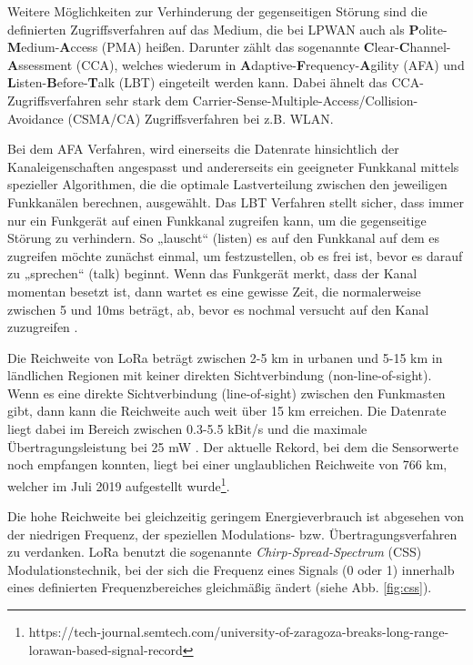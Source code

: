 Weitere Möglichkeiten zur Verhinderung der gegenseitigen Störung sind die definierten Zugriffsverfahren auf das Medium, die bei LPWAN auch als \textbf{P}olite-\textbf{M}edium-\textbf{A}ccess (PMA) heißen. Darunter zählt das sogenannte \textbf{C}lear-\textbf{C}hannel-\textbf{A}ssessment (CCA), welches wiederum in \textbf{A}daptive-\textbf{F}requency-\textbf{A}gility (AFA) und \textbf{L}isten-\textbf{B}efore-\textbf{T}alk (LBT) eingeteilt werden kann. Dabei ähnelt das CCA-Zugriffsverfahren sehr stark dem Carrier-Sense-Multiple-Access/Collision-Avoidance (CSMA/CA) Zugriffsverfahren bei z.B. WLAN.

Bei dem AFA Verfahren, wird einerseits die Datenrate hinsichtlich der Kanaleigenschaften angespasst und andererseits ein geeigneter Funkkanal mittels spezieller Algorithmen, die die optimale Lastverteilung zwischen den jeweiligen Funkkanälen berechnen, ausgewählt. Das LBT Verfahren stellt sicher, dass immer nur ein Funkgerät auf einen Funkkanal zugreifen kann, um die gegenseitige Störung zu verhindern. So „lauscht“ (listen) es auf den Funkkanal auf dem es zugreifen möchte zunächst einmal, um festzustellen, ob es frei ist, bevor es darauf zu „sprechen“ (talk) beginnt. Wenn das Funkgerät merkt, dass der Kanal momentan besetzt ist, dann wartet es eine gewisse Zeit, die normalerweise zwischen 5 und 10ms beträgt, ab, bevor es nochmal versucht auf den Kanal zuzugreifen \cite{Staniec2020}. 

Die Reichweite von LoRa beträgt zwischen 2-5 km in urbanen und 5-15 km in ländlichen Regionen mit keiner direkten Sichtverbindung (non-line-of-sight). Wenn es eine direkte Sichtverbindung (line-of-sight) zwischen den Funkmasten gibt, dann kann die Reichweite auch weit über 15 km erreichen. Die Datenrate liegt dabei im Bereich zwischen 0.3-5.5 kBit/s und die maximale Übertragungsleistung bei 25 mW \cite{lora2022}. Der aktuelle Rekord, bei dem die Sensorwerte noch empfangen konnten, liegt bei einer unglaublichen Reichweite von 766 km, welcher im Juli 2019 aufgestellt wurde\footnote{https://tech-journal.semtech.com/university-of-zaragoza-breaks-long-range-lorawan-based-signal-record}.

Die hohe Reichweite bei gleichzeitig geringem Energieverbrauch ist abgesehen von der niedrigen Frequenz, der speziellen Modulations- bzw. Übertragungsverfahren zu verdanken. LoRa benutzt die sogenannte \textit{Chirp-Spread-Spectrum} (CSS) Modulationstechnik, bei der sich die Frequenz eines Signals (0 oder 1) innerhalb eines definierten Frequenzbereiches gleichmäßig ändert (siehe Abb. \ref{fig:css}). 

